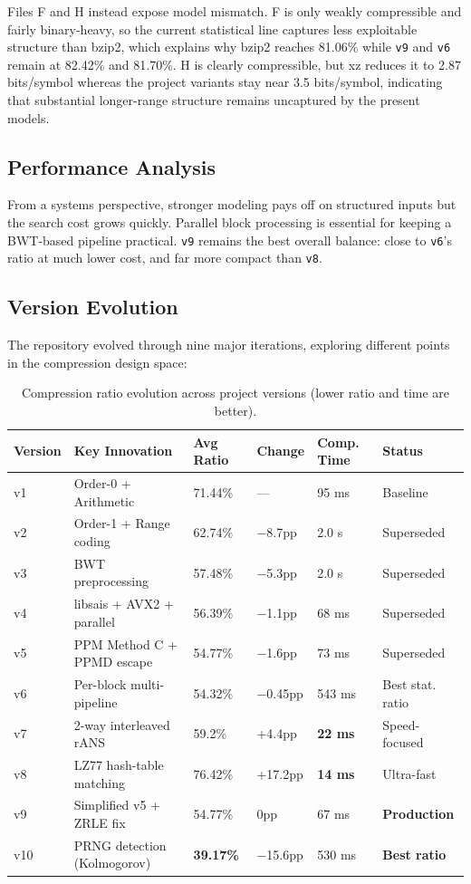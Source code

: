 Files F and H instead expose model mismatch. F is only weakly compressible and fairly binary-heavy, so the current statistical line captures less exploitable structure than bzip2, which explains why bzip2 reaches 81.06\% while \texttt{v9} and \texttt{v6} remain at 82.42\% and 81.70\%. H is clearly compressible, but xz reduces it to 2.87 bits/symbol whereas the project variants stay near 3.5 bits/symbol, indicating that substantial longer-range structure remains uncaptured by the present models.

\subsection{Performance Analysis}
From a systems perspective, stronger modeling pays off on structured inputs but the search cost grows quickly. Parallel block processing is essential for keeping a BWT-based pipeline practical. \texttt{v9} remains the best overall balance: close to \texttt{v6}'s ratio at much lower cost, and far more compact than \texttt{v8}.

\subsection{Version Evolution}
The repository evolved through nine major iterations, exploring different points in the compression design space:

\begin{table}[htbp]
\centering
\scriptsize
\begin{tabular}{llllll}
\toprule
\textbf{Version} & \textbf{Key Innovation} & \textbf{Avg Ratio} & \textbf{Change} & \textbf{Comp. Time} & \textbf{Status} \\
\midrule
v1 & Order-0 + Arithmetic & 71.44\% & --- & 95 ms & Baseline \\
v2 & Order-1 + Range coding & 62.74\% & $-$8.7pp & 2.0 s & Superseded \\
v3 & BWT preprocessing & 57.48\% & $-$5.3pp & 2.0 s & Superseded \\
v4 & libsais + AVX2 + parallel & 56.39\% & $-$1.1pp & 68 ms & Superseded \\
v5 & PPM Method C + PPMD escape & 54.77\% & $-$1.6pp & 73 ms & Superseded \\
v6 & Per-block multi-pipeline & 54.32\% & $-$0.45pp & 543 ms & Best stat. ratio \\
v7 & 2-way interleaved rANS \cite{giesen2014} & 59.2\% & +4.4pp & \textbf{22 ms} & Speed-focused \\
v8 & LZ77 hash-table matching & 76.42\% & +17.2pp & \textbf{14 ms} & Ultra-fast \\
v9 & Simplified v5 + ZRLE fix & 54.77\% & 0pp & 67 ms & \textbf{Production} \\
v10 & PRNG detection (Kolmogorov) & \textbf{39.17\%} & $-$15.6pp & 530 ms & \textbf{Best ratio} \\
\bottomrule
\end{tabular}
\caption{Compression ratio evolution across project versions (lower ratio and time are better).}
\label{tab:version_evolution}
\end{table}

